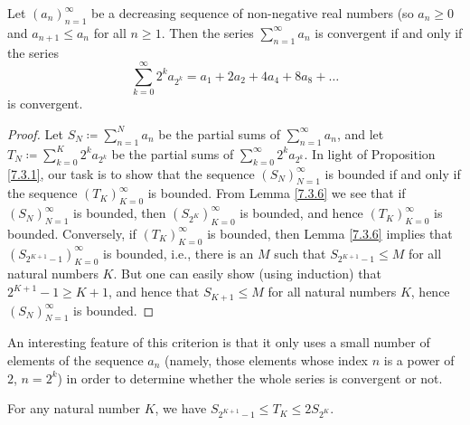 \begin{proposition}\label{7.3.4}
Let \((a_n)_{n = 1}^\infty\) be a decreasing sequence of non-negative real numbers (so \(a_n \geq 0\) and \(a_{n + 1} \leq a_n\) for all \(n \geq 1\).
Then the series \(\sum_{n = 1}^\infty a_n\) is convergent if and only if the series
\[
    \sum_{k = 0}^\infty 2^k a_{2^k} = a_1 + 2a_2 + 4a_4 + 8a_8 + \dots
\]
is convergent.
\end{proposition}

\begin{proof}
Let \(S_N \coloneqq \sum_{n = 1}^N a_n\) be the partial sums of \(\sum_{n = 1}^\infty a_n\), and let \(T_N \coloneqq \sum_{k = 0}^K 2^k a_{2^k}\) be the partial sums of \(\sum_{k = 0}^\infty 2^k a_{2^k}\).
In light of Proposition \ref{7.3.1}, our task is to show that the sequence \((S_N)_{N = 1}^\infty\) is bounded if and only if the sequence \((T_K)_{K = 0}^\infty\) is bounded.
From Lemma \ref{7.3.6} we see that if \((S_N)_{N = 1}^\infty\) is bounded, then \((S_{2^K})_{K = 0}^\infty\) is bounded, and hence \((T_K)_{K = 0}^\infty\) is bounded.
Conversely, if \((T_K)_{K = 0}^\infty\) is bounded, then Lemma \ref{7.3.6} implies that \((S_{2^{K + 1} - 1})_{K = 0}^\infty\) is bounded, i.e., there is an \(M\) such that \(S_{2^{K + 1} - 1} \leq M\) for all natural numbers \(K\).
But one can easily show (using induction) that \(2^{K + 1} - 1 \geq K + 1\), and hence that \(S_{K + 1} \leq M\) for all natural numbers \(K\), hence \((S_N)_{N = 1}^\infty\) is bounded.
\end{proof}

\begin{remark}\label{7.3.5}
An interesting feature of this criterion is that it only uses a small number of elements of the sequence \(a_n\)
(namely, those elements whose index \(n\) is a power of \(2\), \(n = 2^k\))
in order to determine whether the whole series is convergent or not.
\end{remark}

\begin{lemma}\label{7.3.6}
For any natural number \(K\), we have \(S_{2^{K + 1} - 1} \leq T_K \leq 2S_{2^K}\).
\end{lemma}

